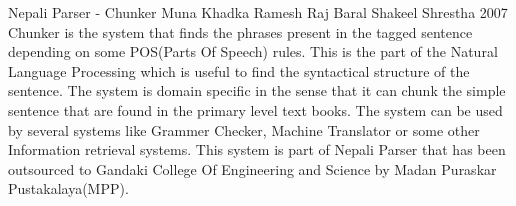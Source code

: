  \begin{conf-abstract}[]
{Nepali Parser - Chunker}
{
Muna Khadka
Ramesh Raj Baral
Shakeel Shrestha
}
{2007}
Chunker is the system that finds the phrases present in the tagged sentence
depending on some POS(Parts Of Speech) rules. This is the part of the Natural
Language Processing which is useful to find the syntactical structure of the
sentence. The system is domain specific in the sense that it can chunk the simple sentence that are found in the primary level text books. The system can be used
by several systems like Grammer Checker, Machine Translator or some other 
Information retrieval systems. This system is part of Nepali Parser that has
been outsourced to Gandaki College Of Engineering and Science by Madan Puraskar 
Pustakalaya(MPP).
  \end{conf-abstract}